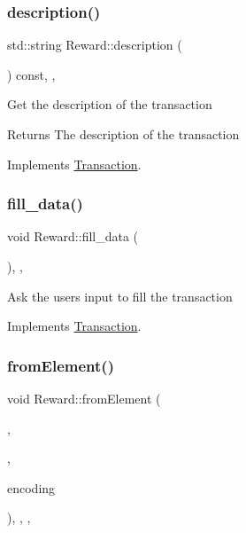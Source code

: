 \subsubsection{\texorpdfstring{description()}{description()}}
{\footnotesize\ttfamily std\+::string Reward\+::description (\begin{DoxyParamCaption}{ }\end{DoxyParamCaption}) const\hspace{0.3cm}{\ttfamily [final]}, {\ttfamily [virtual]}, {\ttfamily [inherited]}}

Get the description of the transaction

\begin{DoxyReturn}{Returns}
The description of the transaction 
\end{DoxyReturn}


Implements \mbox{\hyperlink{classTransaction_ad27fb61fcd91863c57ba96a7159b4e8a}{Transaction}}.

\mbox{\label{classReward_a30a40e2eefd0aea969fab46d1e22d145}} 
\subsubsection{\texorpdfstring{fill\+\_\+data()}{fill\_data()}}
{\footnotesize\ttfamily void Reward\+::fill\+\_\+data (\begin{DoxyParamCaption}{ }\end{DoxyParamCaption})\hspace{0.3cm}{\ttfamily [final]}, {\ttfamily [virtual]}, {\ttfamily [inherited]}}

Ask the user\textquotesingle{}s input to fill the transaction 

Implements \mbox{\hyperlink{classTransaction_a73b16e3d7e4c24e5b4da203740691e65}{Transaction}}.

\mbox{\label{classReward_a6d16e21b60b7f11c7aaf0098a53118a2}} 
\subsubsection{\texorpdfstring{from\+Element()}{fromElement()}}
{\footnotesize\ttfamily void Reward\+::from\+Element (\begin{DoxyParamCaption}\item[{\mbox{\hyperlink{classElementObject}{Element\+Object}} $\ast$}]{,  }\item[{const \mbox{\hyperlink{classSerializer}{Serializer}} $\ast$}]{,  }\item[{const char $\ast$}]{encoding }\end{DoxyParamCaption})\hspace{0.3cm}{\ttfamily [final]}, {\ttfamily [protected]}, {\ttfamily [virtual]}, {\ttfamily [inherited]}}

